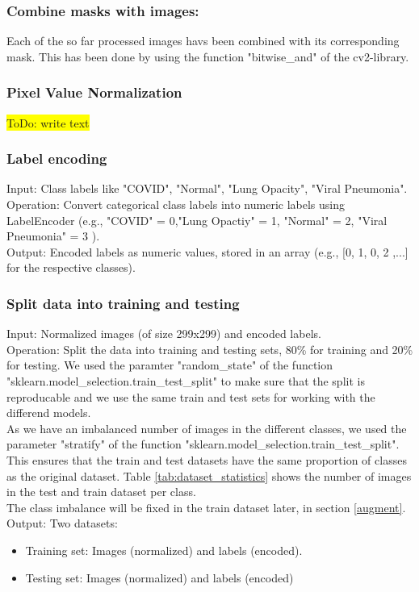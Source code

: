 \documentclass{article}
\begin{document}
\subsubsection{Combine masks with images:}
Each of the so far processed images havs been combined with its corresponding mask. This has been done by using the function "bitwise\_and" of the cv2-library.\\

\subsubsection{Pixel Value Normalization}
    \colorbox{yellow}{ToDo: write text}
    
\subsubsection{Label encoding}
Input: Class labels like "COVID", "Normal", "Lung Opacity", "Viral Pneumonia".\\
Operation: Convert categorical class labels into numeric labels using LabelEncoder (e.g., "COVID" = 0,"Lung Opactiy" = 1, "Normal" = 2, "Viral Pneumonia" = 3 ).\\
Output: Encoded labels as numeric values, stored in an array (e.g., [0, 1, 0, 2 ,...] for the respective classes).\\

\subsubsection{Split data into training and testing} \label{split_test_train}
Input: Normalized images (of size 299x299) and encoded labels.\\
Operation: Split the data into training and testing sets, 80\% for training and 20\% for testing. We used the paramter "random\_state" of the function 
"sklearn.model\_selection.train\_test\_split" to make sure that the split is reproducable and we use the same train and test sets for working with the differend models.\\
As we have an imbalanced number of images in the different classes, we used the parameter "stratify" of the function "sklearn.model\_selection.train\_test\_split". This
ensures that the train and test datasets have the same proportion of classes as the original dataset. Table \ref{tab:dataset_statistics} shows the number of images in 
the test and train dataset per class.\\
The class imbalance will be fixed in the train dataset later, in section \ref{augment}.\\
Output: Two datasets:
\begin{itemize}
    \item Training set: Images (normalized) and labels (encoded).
    \item Testing set: Images (normalized) and labels (encoded)
\end{itemize}
\end{document}

